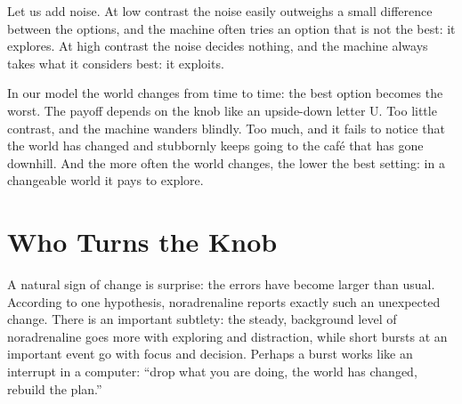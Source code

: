 Let us add noise. At low contrast the noise easily outweighs a small difference between the options, and the machine often tries an option that is not the best: it explores. At high contrast the noise decides nothing, and the machine always takes what it considers best: it exploits.

In our model the world changes from time to time: the best option becomes the worst. The payoff depends on the knob like an upside-down letter U. Too little contrast, and the machine wanders blindly. Too much, and it fails to notice that the world has changed and stubbornly keeps going to the café that has gone downhill. And the more often the world changes, the lower the best setting: in a changeable world it pays to explore.


\section*{Who Turns the Knob}

A natural sign of change is surprise: the errors have become larger than usual. According to one hypothesis, noradrenaline reports exactly such an unexpected change. There is an important subtlety: the steady, background level of noradrenaline goes more with exploring and distraction, while short bursts at an important event go with focus and decision. Perhaps a burst works like an interrupt in a computer: ``drop what you are doing, the world has changed, rebuild the plan.''

